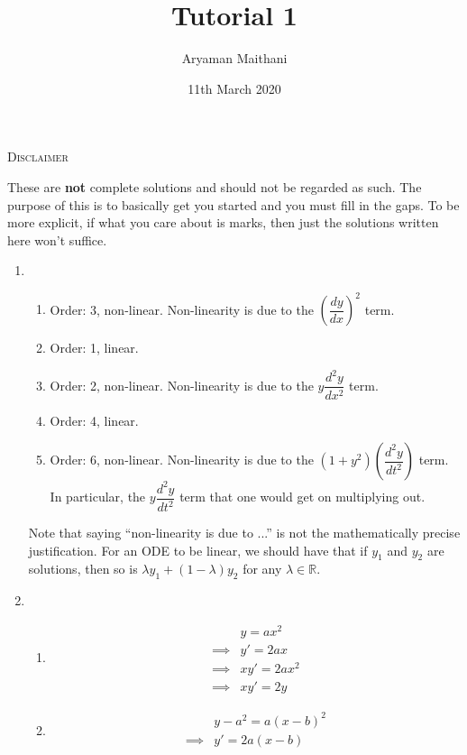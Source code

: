 \documentclass{article}
\title{Tutorial 1}				%
\author{Aryaman Maithani}%
\date{11th March 2020}		%
\begin{document}
\maketitle

\hrulefill

\begin{center}
	\textsc{Disclaimer}
\end{center}
These are \textbf{not} complete solutions and should not be regarded as such. The purpose of this is to basically get you started and you must fill in the gaps. To be more explicit, if what you care about is marks, then just the solutions written here won't suffice.

\hrulefill

\begin{enumerate}[label = Q.\arabic*.] 
	\item 
	\begin{enumerate}[label = (\roman*)] 
		\item Order: 3, non-linear. Non-linearity is due to the $\left(\dfrac{dy}{dx}\right)^2$ term.
		\item Order: 1, linear.
		\item Order: 2, non-linear. Non-linearity is due to the $y\dfrac{d^2y}{dx^2}$ term.
		\item Order: 4, linear.
		\item Order: 6, non-linear. Non-linearity is due to the $(1 + y^2)\left(\dfrac{d^2y}{dt^2}\right)$ term. In particular, the $y\dfrac{d^2y}{dt^2}$ term that one would get on multiplying out.
	\end{enumerate}
	Note that saying ``non-linearity is due to ...'' is not the mathematically precise justification. For an ODE to be linear, we should have that if $y_1$ and $y_2$ are solutions, then so is $\lambda y_1 + (1 - \lambda)y_2$ for any $\lambda \in \mathbb{R}.$
	\item \begin{enumerate}[label = (\roman*)] 
		\item \begin{align*} 
			& y = ax^2\\
			\implies & y' = 2ax\\
			\implies & xy' = 2ax^2\\
			\implies & xy' = 2y
		\end{align*}
		\item \begin{align*} 
			& y - a^2 = a(x - b)^2\\
			\implies & y' = 2a(x - b)\\

\end{align*}
\end{enumerate}
\end{enumerate}
\end{document}
